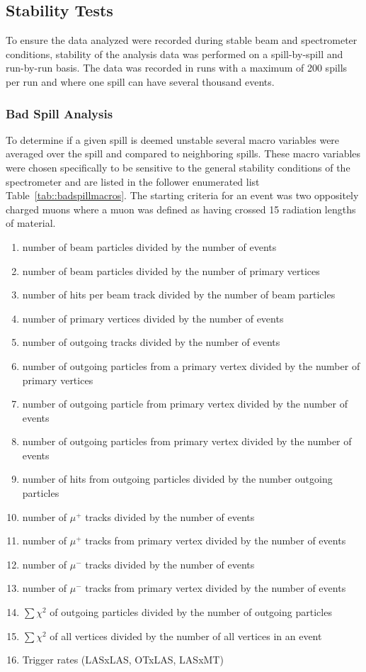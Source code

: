 \subsection{Stability Tests} \label{sec::stability}
To ensure the data analyzed were recorded during stable beam and spectrometer
conditions, stability of the analysis data was performed on a spill-by-spill and
run-by-run basis.  The data was recorded in runs with a maximum of 200 spills
per run and where one spill can have several thousand events.

\subsubsection{Bad Spill Analysis} To determine if a given spill is deemed
unstable several macro variables were averaged over the spill and compared to
neighboring spills.  These macro variables were chosen specifically to be
sensitive to the general stability conditions of the spectrometer and are listed
in the follower enumerated list Table~\ref{tab::badspillmacros}.  The starting
criteria for an event was two oppositely charged muons where a muon was defined
as having crossed 15 radiation lengths of material.

\begin{enumerate}
  \label{tab::badspillmacros}
\item number of beam particles divided by the number of events
\item number of beam particles divided by the number of primary vertices
\item number of hits per beam track divided by the number of beam particles
\item number of primary vertices divided by the number of events
\item number of outgoing tracks divided by the number of events
\item number of outgoing particles from a primary vertex divided by the number
  of primary vertices
\item number of outgoing particle from primary vertex divided by the number of
  events
\item number of outgoing particles from primary vertex divided by the number of
  events
\item number of hits from outgoing particles divided by the number outgoing
  particles
\item number of $\mu^+$ tracks divided by the number of events
\item number of $\mu^+$ tracks from primary vertex divided by the number of
  events
\item number of $\mu^-$ tracks divided by the number of events
\item number of $\mu^-$ tracks from primary vertex divided by the number of
  events
\item $\sum \chi^2$ of outgoing particles divided by the number of outgoing
  particles
\item $\sum \chi^2$ of all vertices divided by the number of all vertices in an
  event
\item Trigger rates (LASxLAS, OTxLAS, LASxMT)
\end{enumerate}

